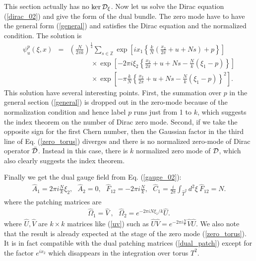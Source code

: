 \documentclass[a4paper,epsf,12pt]{article}
\newcommand{\Z}{{\mathbb{Z}}}
\newcommand{\cD}{{\cal D}}
\newcommand{\fr}{\frac}
\newcommand{\qua}{\frac{1}{4}}
\newcommand{\nn}{\nonumber\\}
\newcommand{\Ch}{\hat{C}}
\newcommand{\Fh}{\hat{F}}
\newcommand{\Th}{\hat{T}}
\newcommand{\Omegah}{\hat{\Omega}}
\def \cD{{\cal D}}
\def \cDb{{\bar {\cal D}}}
\begin{document}
This section actually has no $\ker\cD_\xi$. 
Now let us solve the Dirac equation (\ref{dirac_02}) 
and give the form of the dual bundle. 
The zero mode have to have the general form (\ref{general})
and satisfies the Dirac equation and the normalized condition.
The solution is 
\begin{eqnarray}
\label{zero_torus}
\psi_u^p(\xi,x)
&=&\left(\fr{N}{2\pi k}\right)^{\qua}
\sum_{s\in \Z} \exp\left[ix_1
\left\{\frac{k}{N}\left(\frac{x_2}{2\pi}+u+Ns\right)+p
\right\}\right]\nn
&&~~~~~~~~~~~~~~\times 
\exp\left[-2\pi i\xi_2\left\{\fr{x_2}{2\pi}+u+Ns-\frac{N}{k}(\xi_1-p)
\right\}\right]\nn
&&~~~~~~~~~~~~~~\times 
\exp\left[-\pi\frac{k}{N}\left\{\frac{x_2}{2\pi}+u+Ns
-\fr{N}{k}(\xi_1-p)\right\}^2\right].
\end{eqnarray}
This solution have several interesting points.
First, the summation over $p$ in the general section (\ref{general})
is dropped out in the zero-mode because of the normalization condition
and hence label $p$ runs just from 1 to $k$, 
which suggests the index theorem on the number of Dirac
zero mode. Second, if we take the opposite sign for the first Chern
number, 
then the Gaussian factor in the third line of Eq. (\ref{zero_torus})
diverges and there is no normalized zero-mode of Dirac operator $\cDb$.
Instead in this case, there is $k$ normalized zero mode of $\cD$,
which also clearly suggests the index theorem.

Finally we get the dual gauge field from Eq. (\ref{gauge_02}): 
\begin{eqnarray*} 
\hat{A}_1=2\pi i\frac{N}{k}\xi_2,~~~\hat{A}_2=0,
~~~\Fh_{12}=-2\pi i\frac{N}{k},
~~~\Ch_1=\fr{i}{2\pi}\int_{\Th^2}d^2\xi~\Fh_{12}=N .
\end{eqnarray*}
where the patching matrices are
\begin{eqnarray}
\label{dual_patch}
\Omegah_{1}=\hat{V}\ ,~~~ \Omegah_{2}=e^{-2\pi iN\xi_1/k}\hat{U}.
\end{eqnarray}
where $\hat{U}, \hat{V}$ are $k\times k$ matrices like (\ref{uv}) such as
$\hat{U}\hat{V}=e^{- 2\pi i\frac{N}{k}}\hat{V}\hat{U}$. 
We also note that the result is already expected at the stage of 
the zero mode (\ref{zero_torus}). It is in fact 
%
compatible with the dual patching matrices (\ref{dual_patch}) except for
the factor $e^{ix_2}$ which disappears in the integration over torus $T^2$.
\end{document}
